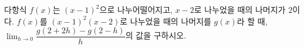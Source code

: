 다항식 $f(x)$는 $(x-1)^2$으로 나누어떨어지고, $x-2$로 나누었을 때의 나머지가 $2$이다. $f(x)$를 $(x-1)^2(x-2)$로 나누었을 때의 나머지를 $g(x)$라 할 때, $\displaystyle\lim_{h\to 0}\dfrac{g(2+2h)-g(2-h)}{h}$의 값을 구하시오.
